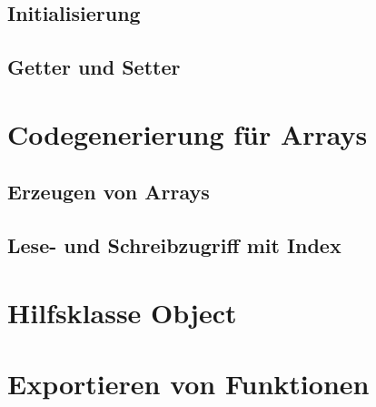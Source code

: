 \subsection{Initialisierung}
\subsection{Getter und Setter}

\section{Codegenerierung für Arrays}
\subsection{Erzeugen von Arrays}
\subsection{Lese- und Schreibzugriff mit Index}

\section{Hilfsklasse Object}

\section{Exportieren von Funktionen}
